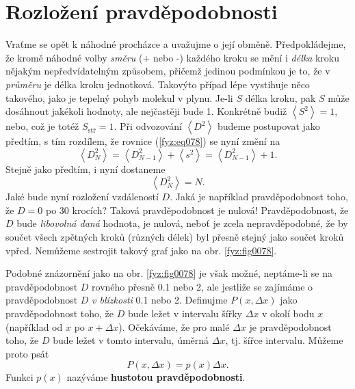  \section{Rozložení pravděpodobnosti}
    Vraťme se opět k náhodné procházce a uvažujme o její obměně. Předpokládejme, že kromě náhodné 
    volby \emph{směru} (+ nebo -) každého kroku se mění i \emph{délka} kroku nějakým 
    nepředvídatelným způsobem, přičemž jedinou podmínkou je to, že v \emph{průměru} je délka kroku 
    jednotková. Takovýto případ lépe vystihuje něco takového, jako je tepelný pohyb molekul v 
    plynu. Je-li \(S\) délka kroku, pak \(S\) může dosáhnout jakékoli hodnoty, ale nejčastěji bude 
     \num{1}. Konkrétně budiž \(\left\langle S^2\right\rangle = 1\), nebo, což je totéž 
    \(S_{\text{stř}} = 1\). Při odvozování \(\left\langle D^2\right\rangle\) budeme postupovat jako 
    předtím, s tím rozdílem, že rovnice (\ref{fyz:eq078}) se nyní změní na
    \begin{equation}\label{fyz:eq086}
      \left\langle D_N^2\right\rangle 
        = \left\langle D_{N-1}^2\right\rangle + \left\langle s^2\right\rangle
        = \left\langle D_{N-1}^2\right\rangle + 1.
    \end{equation}
    Stejně jako předtím, i nyní dostaneme
    \begin{equation}\label{fyz:eq087}
      \left\langle D_N^2\right\rangle = N.
    \end{equation}
    Jaké bude nyní rozložení vzdáleností \(D\). Jaká je například pravděpodobnost toho, že \(D = 
    0\) po \num{30} krocích? Taková pravděpodobnost je nulová! Pravděpodobnost, že \(D\) bude 
    \emph{libovolná daná} hodnota, je nulová, neboť je zcela nepravděpodobné, že by součet všech 
    zpětných kroků (různých délek) byl přesně stejný jako součet kroků vpřed. Nemůžeme sestrojit 
    takový graf jako na obr. \ref{fyz:fig0078}.
    
    Podobné znázornění jako na obr. \ref{fyz:fig0078} je však možné, neptáme-li se na 
    pravděpodobnost \(D\) rovného přesně \num{0.1} nebo \num{2}, ale jestliže se zajímáme o 
    pravděpodobnost \(D\) \emph{v blízkosti} \num{0.1} nebo \num{2}. Definujme \(P(x, \Delta x)\) 
    jako pravděpodobnost toho, že \(D\) bude ležet v intervalu šířky \(\Delta x\) v okolí bodu 
    \(x\) (například od \(x\) po \(x + \Delta x\)). Očekáváme, že pro malé \(\Delta x\) je 
    pravděpodobnost toho, že \(D\) bude ležet v tomto intervalu, úměrná \(\Delta x\), tj. šířce 
    intervalu. Můžeme proto psát
    \begin{equation}\label{fyz:eq088}
      P(x,\Delta x) = p(x)\Delta x.
    \end{equation}
    Funkci \(p(x)\) nazýváme \textbf{hustotou pravděpodobnosti}.
    
